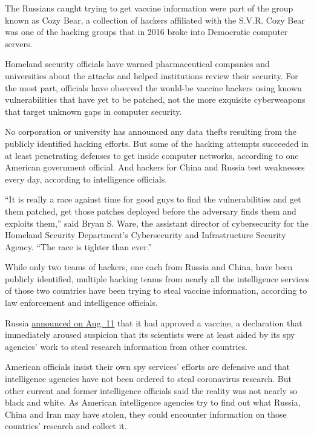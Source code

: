 The Russians caught trying to get vaccine information were part of the
group known as Cozy Bear, a collection of hackers affiliated with the
S.V.R. Cozy Bear was one of the hacking groups that in 2016 broke into
Democratic computer servers.

Homeland security officials have warned pharmaceutical companies and
universities about the attacks and helped institutions review their
security. For the most part, officials have observed the would-be
vaccine hackers using known vulnerabilities that have yet to be patched,
not the more exquisite cyberweapons that target unknown gaps in computer
security.

No corporation or university has announced any data thefts resulting
from the publicly identified hacking efforts. But some of the hacking
attempts succeeded in at least penetrating defenses to get inside
computer networks, according to one American government official. And
hackers for China and Russia test weaknesses every day, according to
intelligence officials.

``It is really a race against time for good guys to find the
vulnerabilities and get them patched, get those patches deployed before
the adversary finds them and exploits them,'' said Bryan S. Ware, the
assistant director of cybersecurity for the Homeland Security
Department's Cybersecurity and Infrastructure Security Agency. ``The
race is tighter than ever.''

While only two teams of hackers, one each from Russia and China, have
been publicly identified, multiple hacking teams from nearly all the
intelligence services of those two countries have been trying to steal
vaccine information, according to law enforcement and intelligence
officials.

Russia
\href{https://www.nytimes3xbfgragh.onion/2020/08/11/world/europe/russia-coronavirus-vaccine-approval.html}{announced
on Aug. 11} that it had approved a vaccine, a declaration that
immediately aroused suspicion that its scientists were at least aided by
its spy agencies' work to steal research information from other
countries.

American officials insist their own spy services' efforts are defensive
and that intelligence agencies have not been ordered to steal
coronavirus research. But other current and former intelligence
officials said the reality was not nearly so black and white. As
American intelligence agencies try to find out what Russia, China and
Iran may have stolen, they could encounter information on those
countries' research and collect it.

